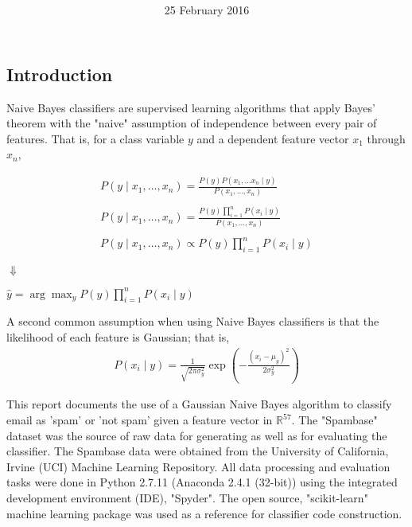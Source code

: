 \documentclass[12pt]{article}
\title{
\vspace{2in}
\textmd{\textbf{\hmwkTitle}}\\
\textit{\normalsize \hmwkClass}
\vspace{3in}
}
\author{\textbf{\hmwkAuthorName}}
\date{25 February 2016} %
\begin{document}
\maketitle
\thispagestyle{empty}
\clearpage\maketitle

\subsection{Introduction}
Naive Bayes classifiers are supervised learning algorithms that apply Bayes' theorem with the "naive" assumption of independence between every pair of features. That is, for a class variable $y$ and a dependent feature vector $x_1$ through $x_n$,

\begin{align*}
P(y \mid x_1, \dots, x_n) = \frac{P(y) P(x_1, \dots x_n \mid y)}{P(x_1, \dots, x_n)}\\
\\
P(y \mid x_1, \dots, x_n) = \frac{P(y) \prod_{i=1}^{n} P(x_i \mid y)}{P(x_1, \dots, x_n)}\\
\\
P(y \mid x_1, \dots, x_n) \propto P(y) \prod_{i=1}^{n} P(x_i \mid y)
\end{align*}

\begin{center}
$\Downarrow$
\end{center}

\begin{center}
$\hat{y} = \arg\max_y P(y) \prod_{i=1}^{n} P(x_i \mid y)$
\end{center}

A second common assumption when using Naive Bayes classifiers is that the likelihood of each feature is Gaussian; that is,
\begin{align*}
P(x_i \mid y) = \frac{1}{\sqrt{2\pi\sigma^2_y}} \exp\left(-\frac{(x_i - \mu_y)^2}{2\sigma^2_y}\right)
\end{align*}

This report documents the use of a Gaussian Naive Bayes algorithm to classify email as 'spam' or 'not spam' given a feature vector in $ \mathbb{R}^{57}$. The "Spambase" dataset was the source of raw data for generating as well as for evaluating the classifier. The Spambase data were obtained from the University of California, Irvine (UCI) Machine Learning Repository. All data processing and evaluation tasks were done in Python 2.7.11 (Anaconda 2.4.1 (32-bit)) using the integrated development environment (IDE), "Spyder". The open source, "scikit-learn" machine learning package was used as a reference for classifier code construction.\\
\end{document}
